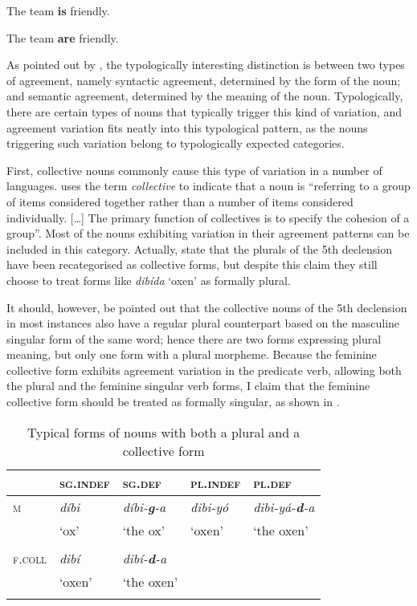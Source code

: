 \documentclass[output=paper]{langsci/langscibook}
\begin{document}
\ea\label{ex:nilsson:6} 
\ea\label{ex:nilsson:6a} The team \textbf{is} friendly.

\ex\label{ex:nilsson:6b}
 The team \textbf{are} friendly.
\z
\z

As pointed out by \citet[187]{Corbett2000}, the typologically interesting distinction is between two types of agreement, namely syntactic agreement, determined by the form of the noun; and semantic agreement, determined by the meaning of the noun. Typologically, there are certain types of nouns that typically trigger this kind of variation, and  agreement variation fits neatly into this typological pattern, as the  nouns triggering such variation belong to typologically expected categories.

First, collective nouns commonly cause this type of variation in a number of languages. \citet[118–119]{Corbett2000} uses the term \textit{collective} to indicate that a noun is “referring to a group of items considered together rather than a number of items considered individually. […] The primary function of collectives is to specify the cohesion of a group”. Most of the  nouns exhibiting variation in their agreement patterns can be included in this category. Actually, \citet[82]{Siyaad1984} state that the plurals of the  5th declension have been recategorised as collective forms, but despite this claim they still choose to treat forms like \textit{dibída} ‘oxen’ as formally plural.

It should, however, be pointed out that the collective nouns of the 5th declension in most instances also have a regular plural counterpart based on the masculine singular form of the same word; hence there are two forms expressing plural meaning, but only one form with a plural morpheme. Because the feminine collective form exhibits agreement variation in the predicate verb, allowing both the plural and the feminine singular verb forms, I claim that the feminine collective form should be treated as formally singular, as shown in .
 
\begin{table}[p]
\caption{Typical forms of nouns with both a plural and a collective form}
\label{tab:nilsson:9}

\begin{tabularx}{\textwidth}{XXXXX} 
\lsptoprule
& {\textsc{sg.indef}} & {\textsc{sg.def}} & {\textsc{pl.indef}} & {\textsc{pl.def}}\\
\midrule
{\textsc{m}} & 
\textit{díbi}  & 
{\textit{díbi-}\textbf{\textit{g}}\textit{-a}}  & {\textit{dibi-yó}}  & {\textit{dibi-yá-}\textbf{\textit{d}}\textit{-a}}  \\
& ‘ox’ & {‘the ox’} & {‘oxen’} & {‘the oxen’} \\
\\ 

{\textsc{f.coll}} & {\textit{dibí}} 
  & {\textit{dibí-}\textbf{\textit{d}}\textit{-a}} \\

& {‘oxen’} &  {‘the oxen’} 
\\
\lspbottomrule
\end{tabularx}
\end{table} 
\end{document}
